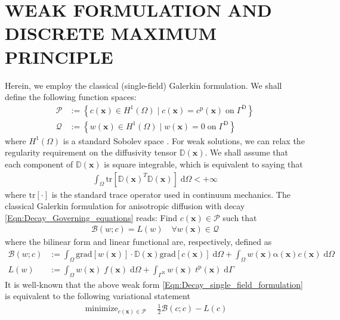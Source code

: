 \documentclass[11pt]{amsart}
\begin{document}
\section{WEAK FORMULATION AND DISCRETE MAXIMUM PRINCIPLE}
\label{Sec:Decay_Nonnegative}
Herein, we employ the classical (single-field) Galerkin formulation. We shall 
define the following function spaces:
\begin{subequations}
  \begin{align}
    \mathcal{P} &:= \left\{c(\mathbf{x}) \in H^{1}(\Omega) \; \big| \; c(\mathbf{x}) = 
      c^{\mathrm{p}}(\mathbf{x}) \; \mathrm{on} \; \Gamma^{\mathrm{D}}\right\} \\
    \mathcal{Q} &:= \left\{w(\mathbf{x}) \in H^{1}(\Omega) \; \big| \; w(\mathbf{x}) = 0 
      \; \mathrm{on} \; \Gamma^{\mathrm{D}}\right\} 
  \end{align}
\end{subequations}
where $H^{1}(\Omega)$ is a standard Sobolev space \cite{Brezzi_Fortin}. For weak solutions, 
we can relax the regularity requirement on the diffusivity tensor $\mathbb{D}(\mathbf{x})$. 
We shall assume that  each component of $\mathbb{D}(\mathbf{x})$ is square integrable, which 
is equivalent to saying that 
\begin{align}
  \int_{\Omega} \mathrm{tr}[\mathbb{D}(\mathbf{x})^{T} \mathbb{D}(\mathbf{x})] \; 
  \mathrm{d} \Omega < +\infty
\end{align}
where $\mathrm{tr}[\cdot]$ is the standard trace operator \cite{Chadwick} used in 
continuum mechanics. The classical Galerkin formulation for anisotropic diffusion 
with decay \eqref{Eqn:Decay_Governing_equations} reads: Find $c(\mathbf{x}) \in 
\mathcal{P}$ such that 
\begin{align}
  \label{Eqn:Decay_single_field_formulation}
  \mathcal{B}(w;c) = L(w) \quad \forall w(\mathbf{x}) \in \mathcal{Q}
\end{align}
where the bilinear form and linear functional are, respectively, defined as 
\begin{subequations}
  \label{Eqn:Decay_functionals_B_L}
  \begin{align}
    \mathcal{B}(w;c) &:= \int_{\Omega} \mathrm{grad}[w(\mathbf{x})] \cdot \mathbb{D}(\mathbf{x}) 
    \mathrm{grad}[c(\mathbf{x})] \; \mathrm{d} \Omega + \int_{\Omega} w(\mathbf{x})  
    \mathrm{\alpha}(\mathbf{x}) c(\mathbf{x}) \; \mathrm{d} \Omega
    \\
    L(w) &:= \int_{\Omega} w(\mathbf{x}) \; f(\mathbf{x}) \; \mathrm{d} \Omega + 
    \int_{\Gamma^{\mathrm{N}}} w(\mathbf{x}) \; t^{\mathrm{p}}(\mathbf{x}) \; \mathrm{d} \Gamma 
  \end{align}
\end{subequations}
It is well-known that the above weak form \eqref{Eqn:Decay_single_field_formulation} 
is equivalent to the following variational statement
\begin{align}
  \mathop{\mathrm{minimize}}_{c(\mathbf{x}) \in \mathcal{P}} \quad 
  \frac{1}{2} \mathcal{B}(c;c) - L(c)
\end{align}   
\end{document}
